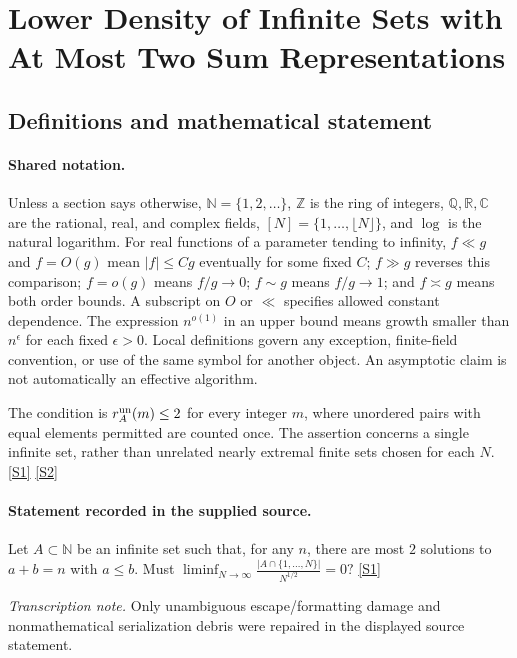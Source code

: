 \documentclass[11pt,a4paper]{article}
\newcommand{\N}{\mathbb{N}}
\newcommand{\Z}{\mathbb{Z}}
\newcommand{\Q}{\mathbb{Q}}
\newcommand{\R}{\mathbb{R}}
\newcommand{\C}{\mathbb{C}}
\newcommand{\sref}[2]{\hyperlink{source:#1:#2}{[S#2]}}
\begin{document}
\section{Lower Density of Infinite Sets with At Most Two Sum Representations}\label{statement}


\subsection{Definitions and mathematical statement}

\paragraph{Shared notation.}Unless a section says otherwise, $\N=\{1,2,\ldots\}$,
$\Z$ is the ring of integers, $\Q,\R,\C$ are the rational, real, and complex
fields, $[N]=\{1,\ldots,\lfloor N\rfloor\}$, and $\log$ is the natural
logarithm. For real functions of a parameter tending to infinity,
$f\ll g$ and $f=O(g)$ mean $|f|\leq Cg$ eventually for some fixed $C$;
$f\gg g$ reverses this comparison; $f=o(g)$ means $f/g\to0$;
$f\sim g$ means $f/g\to1$; and $f\asymp g$ means both order bounds.
A subscript on $O$ or $\ll$ specifies allowed constant dependence.
The expression $n^{o(1)}$ in an upper bound means growth smaller than
$n^\epsilon$ for each fixed $\epsilon>0$. Local definitions govern any
exception, finite-field convention, or use of the same symbol for another
object. An asymptotic claim is not automatically an effective algorithm.



The condition is $r_A^{\rm un}(m)\leq2$ for every integer $m$, where unordered pairs with equal elements permitted are counted once. The assertion concerns a single infinite set, rather than unrelated nearly extremal finite sets chosen for each $N$. \sref{statement}{1} \sref{statement}{2}

\paragraph{Statement recorded in the supplied source.}
Let $A\subset \mathbb{N}$ be an infinite set such that, for any $n$, there are most $2$ solutions to $a+b=n$ with $a\leq b$. Must $ \liminf_{N\to\infty}\frac{\lvert A\cap \{1,\ldots,N\}\rvert}{N^{1/2}}=0? $ \sref{statement}{1}

{\small\emph{Transcription note.} Only unambiguous escape/formatting damage and nonmathematical serialization debris were repaired in the displayed source statement.}
\end{document}
